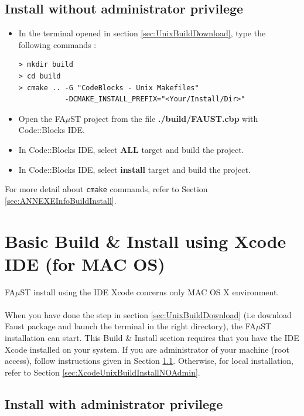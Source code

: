 \subsection{Install without administrator privilege}\label{sec:CodeBlocUnixBuildInstallNOAdmin}
\begin{itemize}
\item In the terminal opened in section 
\ref{sec:UnixBuildDownload}, type the following commands : 
\begin{lstlisting}
> mkdir build
> cd build
> cmake .. -G "CodeBlocks - Unix Makefiles"
  		   -DCMAKE_INSTALL_PREFIX="<Your/Install/Dir>"
\end{lstlisting}

\item Open the FA$\mu$ST project from the file \textbf{./build/FAUST.cbp} with Code::Blocks IDE. 
\item In Code::Blocks IDE, select \textbf{ALL} target and build the project. 
\item In Code::Blocks IDE, select \textbf{install} target and build the project. 
\end{itemize}

For more detail about \texttt{cmake} commands, refer to Section \ref{sec:ANNEXEInfoBuildInstall}.


\section{Basic Build \& Install using Xcode IDE (for MAC OS)}\label{sec:MacInstallXcode}

FA$\mu$ST install using the IDE Xcode concerns only MAC OS X environment.
\paragraph{}When you have done the step in section  \ref{sec:UnixBuildDownload} (i.e download Faust package and launch the terminal in the right directory),  the FA$\mu$ST installation can start. This Build \& Install section requires that you have the IDE Xcode installed on your system. If you are administrator of your machine (root access), follow instructions given in Section \ref{sec:XcodeUnixBuildInstallAdmin}. Otherwise, for local installation, refer to Section \ref{sec:XcodeUnixBuildInstallNOAdmin}. 

\subsection{Install with administrator privilege}\label{sec:XcodeUnixBuildInstallAdmin}
 
